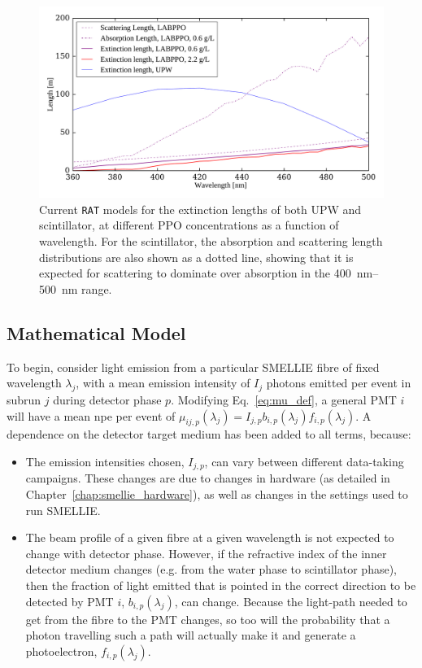 \begin{figure}
    \centering
    \includegraphics[width=\textwidth]{5_SMELLIEAnalysis/images/ext_length_expectations_RAT_nice.pdf}
    \caption[Current \texttt{RAT} models for the extinction lengths of both UPW and scintillator, as a function of wavelength]
    {Current \texttt{RAT} models for the extinction lengths of both UPW and scintillator, at different PPO concentrations as a function of wavelength. For the scintillator, the absorption and scattering length distributions are also shown as a dotted line, showing that it is expected for scattering to dominate over absorption in the \SIrange{400}{500}{\nm} range.}
    \label{fig:smellie_expected_ext_length_phases}
\end{figure}

\subsection{Mathematical Model}
To begin, consider light emission from a particular SMELLIE fibre of fixed wavelength $\lambda_{j}$, with a mean emission intensity of $I_{j}$ photons emitted per event in subrun $j$ during detector phase $p$. Modifying Eq.~\ref{eq:mu_def}, a general PMT $i$ will have a mean npe per event of $\mu_{ij,p}(\lambda_{j}) = I_{j,p}b_{i,p}(\lambda_{j})f_{i,p}(\lambda_{j})$. A dependence on the detector target medium has been added to all terms, because:
\begin{itemize}
    \item The emission intensities chosen, $I_{j,p}$, can vary between different data-taking campaigns. These changes are due to changes in hardware (as detailed in Chapter~\ref{chap:smellie_hardware}), as well as changes in the settings used to run SMELLIE.
    \item The beam profile of a given fibre at a given wavelength is not expected to change with detector phase. However, if the refractive index of the inner detector medium changes (e.g. from the water phase to scintillator phase), then the fraction of light emitted that is pointed in the correct direction to be detected by PMT $i$, $b_{i,p}(\lambda_{j})$, can change. Because the light-path needed to get from the fibre to the PMT changes, so too will the probability that a photon travelling such a path will actually make it and generate a photoelectron, $f_{i,p}(\lambda_{j})$.
\end{itemize}

